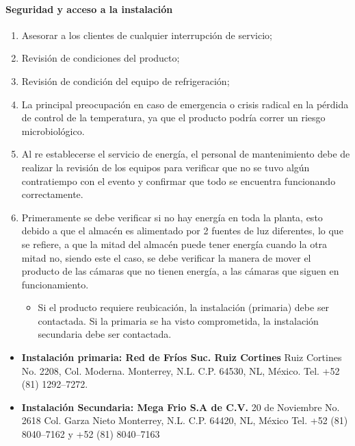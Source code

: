 \paragraph{Seguridad y acceso a la instalación}
\begin{enumerate}
	\item Asesorar a los clientes de cualquier interrupción de servicio;
	\item Revisión de condiciones del producto;
	\item Revisión de condición del equipo de refrigeración;
	\item La principal preocupación en caso de emergencia o crisis radical en la pérdida de control de la temperatura, ya que el producto podría correr un riesgo microbiológico.
	\item Al re establecerse el servicio de energía, el personal de mantenimiento debe de realizar la revisión de los equipos para verificar que no se tuvo algún contratiempo con el evento y confirmar que todo se encuentra funcionando correctamente.
	\item Primeramente se debe verificar si no hay energía en toda la planta, esto debido a que el almacén es alimentado por 2 fuentes de luz diferentes, lo que se refiere, a que la mitad del almacén puede tener energía cuando la otra mitad no, siendo este el caso, se debe verificar la manera de mover el producto de las cámaras que no tienen energía, a las cámaras que siguen en funcionamiento.
	      \begin{itemize}
		      \item Si el producto requiere reubicación, la instalación (primaria) debe ser contactada. Si la primaria se ha visto comprometida, la instalación secundaria debe ser contactada.
	      \end{itemize}
\end{enumerate}

\begin{itemize}
	\item \textbf{Instalación primaria: Red de Fríos Suc. Ruiz Cortines}
	      Ruiz Cortines No. 2208, Col. Moderna. Monterrey, N.L. C.P. 64530, NL, México.
	      Tel. +52 (81) 1292--7272.
	\item \textbf{Instalación Secundaria: Mega Frio S.A de C.V.}
	      20 de Noviembre No. 2618 Col. Garza Nieto Monterrey, N.L. C.P. 64420, NL, México
	      Tel. +52 (81) 8040--7162 y +52 (81) 8040--7163

\end{itemize}

